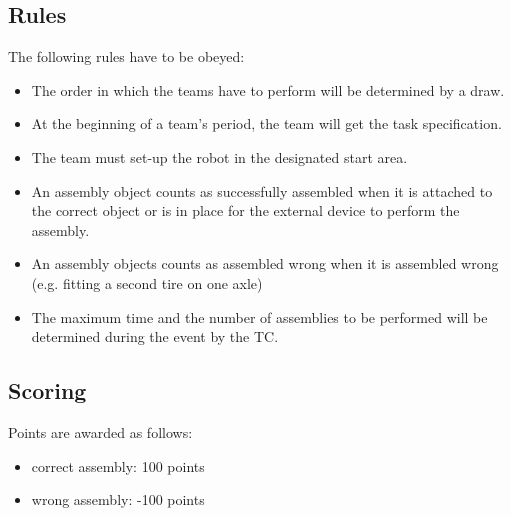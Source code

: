 \subsection{Rules}
The following rules have to be obeyed:

\begin{itemize}
\item The order in which the teams have to perform will be determined by a draw.
\item At the beginning of a team's period, the team will get the task specification. 
\item The team must set-up the robot in the designated start area.
\item An assembly object counts as successfully assembled when it is attached to the correct object or is in place for the external device to perform the assembly.
\item An assembly objects counts as assembled wrong when it is assembled wrong (e.g. fitting a second tire on one axle)
\item The maximum time and the number of assemblies to be performed will be determined during the event by the TC.
\end{itemize}


\subsection{Scoring}
Points are awarded as follows:

\begin{itemize}
\item correct assembly:  \hfill 100 points
\item wrong assembly:  \hfill -100 points
\end{itemize}


